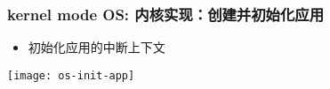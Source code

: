 \begin{frame}
    \frametitle{kernel mode OS: 内核实现：创建并初始化应用}
    
    \begin{itemize}
        \item 初始化应用的中断上下文
    \end{itemize}	
    \centering
    \texttt{[image: os-init-app]}
\end{frame}
%
%
%
%		
%		
%	
%
%
%
%	




